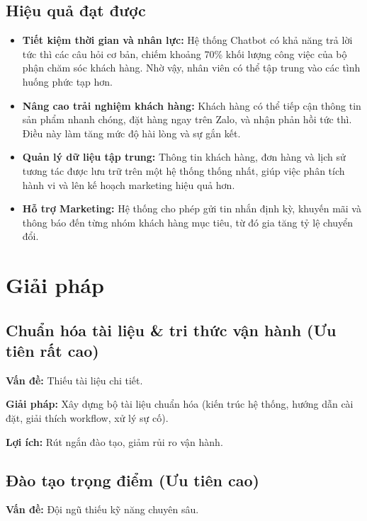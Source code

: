 \subsection*{Hiệu quả đạt được}
\begin{itemize}
    \item \textbf{Tiết kiệm thời gian và nhân lực:} Hệ thống Chatbot có khả năng
    trả lời tức thì các câu hỏi cơ bản, chiếm khoảng 70\% khối lượng công việc
    của bộ phận chăm sóc khách hàng. Nhờ vậy, nhân viên có thể tập trung vào
    các tình huống phức tạp hơn.

    \item \textbf{Nâng cao trải nghiệm khách hàng:} Khách hàng có thể tiếp cận
    thông tin sản phẩm nhanh chóng, đặt hàng ngay trên Zalo, và nhận phản hồi
    tức thì. Điều này làm tăng mức độ hài lòng và sự gắn kết.

    \item \textbf{Quản lý dữ liệu tập trung:} Thông tin khách hàng, đơn hàng và
    lịch sử tương tác được lưu trữ trên một hệ thống thống nhất, giúp việc phân
    tích hành vi và lên kế hoạch marketing hiệu quả hơn.

    \item \textbf{Hỗ trợ Marketing:} Hệ thống cho phép gửi tin nhắn định kỳ,
    khuyến mãi và thông báo đến từng nhóm khách hàng mục tiêu, từ đó gia tăng
    tỷ lệ chuyển đổi.
\end{itemize}

\section{Giải pháp}

\subsection{Chuẩn hóa tài liệu \& tri thức vận hành (Ưu tiên rất cao)}
\textbf{Vấn đề:} Thiếu tài liệu chi tiết.  

\textbf{Giải pháp:} Xây dựng bộ tài liệu chuẩn hóa (kiến trúc hệ thống, hướng dẫn cài đặt, giải thích workflow, xử lý sự cố).  

\textbf{Lợi ích:} Rút ngắn đào tạo, giảm rủi ro vận hành.  

\subsection{Đào tạo trọng điểm (Ưu tiên cao)}
\textbf{Vấn đề:} Đội ngũ thiếu kỹ năng chuyên sâu. 

